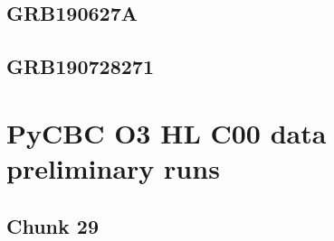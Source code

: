 \documentclass[binding=0.6cm, LaM]{sapthesis}
\begin{document}
\subsection{GRB190627A}

\subsection{GRB190728271}

\section{PyCBC O3 HL C00 data preliminary runs}

\subsection{Chunk 29}


\backmatter
\cleardoublepage


\begin{thebibliography}{100}
\end{thebibliography}
\end{document}
